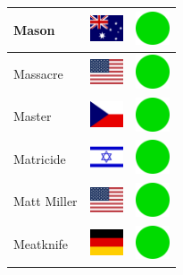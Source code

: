 \documentclass[12pt, a4paper, twoside]{report}
\begin{document}
\begin{center}
\begin{longtable}{|p{5cm}|p{2cm}|p{2cm}|}
 Mason                                                      & \includegraphics[width=1cm]{4x3/au} &   \includegraphics[width=1cm]{likes/y} \\ \hline
 Massacre                                                   & \includegraphics[width=1cm]{4x3/us} &   \includegraphics[width=1cm]{likes/y} \\ \hline
 Master                                                     & \includegraphics[width=1cm]{4x3/cz} &   \includegraphics[width=1cm]{likes/y} \\ \hline
 Matricide                                                  & \includegraphics[width=1cm]{4x3/il} &   \includegraphics[width=1cm]{likes/y} \\ \hline
 Matt Miller                                                & \includegraphics[width=1cm]{4x3/us} &   \includegraphics[width=1cm]{likes/y} \\ \hline
 Meatknife                                                  & \includegraphics[width=1cm]{4x3/de} &   \includegraphics[width=1cm]{likes/y} \\ \hline

\end{longtable}
\end{center}
\end{document}
